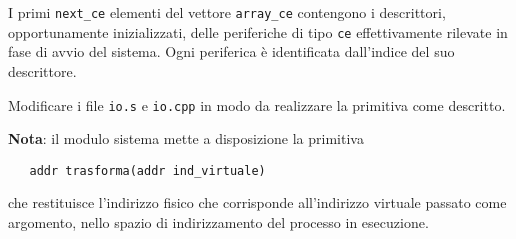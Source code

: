 I primi \verb|next_ce| elementi del vettore \verb|array_ce| contengono i descrittori, opportunamente inizializzati,
delle periferiche di tipo \verb|ce| effettivamente rilevate in fase di avvio del sistema. Ogni periferica \`e identificata
dall'indice del suo descrittore.

Modificare i file \verb|io.s| e \verb|io.cpp| in modo da realizzare la primitiva come descritto.

{\bf Nota}: il modulo sistema mette a disposizione la primitiva 
\begin{verbatim}
   addr trasforma(addr ind_virtuale)
\end{verbatim}
che restituisce
l'indirizzo fisico che corrisponde all'indirizzo virtuale passato come argomento, nello spazio di indirizzamento del
processo in esecuzione.

